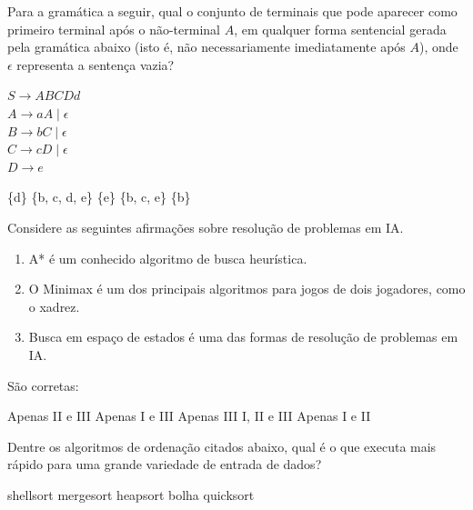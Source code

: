 \documentclass[12pt, addpoints]{exam}
\begin{document}
\begin{questions}
Para a gramática a seguir, qual o conjunto de terminais que pode aparecer como primeiro terminal após o não-terminal \( A \), em qualquer forma sentencial gerada pela gramática abaixo (isto é, não necessariamente imediatamente após \( A \)), onde \( \epsilon \) representa a sentença vazia?



$S \rightarrow ABCDd$\\

$A \rightarrow aA \mid \epsilon$\\

$B \rightarrow bC \mid \epsilon$\\

$C \rightarrow cD \mid \epsilon$\\

$D \rightarrow e$\\
\begin{choices}
\choice \{d\}
\choice \{b, c, d, e\}
\choice \{e\}
\choice \{b, c, e\}
\choice \{b\}
\end{choices}

\question

Considere as seguintes afirmações sobre resolução de problemas em IA.

\begin{enumerate}[label=\Roman*.]

    \item A* é um conhecido algoritmo de busca heurística.

    \item O Minimax é um dos principais algoritmos para jogos de dois jogadores, como o xadrez.

    \item Busca em espaço de estados é uma das formas de resolução de problemas em IA.

\end{enumerate}

São corretas:
\begin{choices}
\choice Apenas II e III
\choice Apenas I e III
\choice Apenas III
\choice I, II e III
\choice Apenas I e II
\end{choices}

\question

Dentre os algoritmos de ordenação citados abaixo, qual é o que executa mais rápido para uma grande variedade de entrada de dados? 
\begin{choices}
\choice shellsort
\choice mergesort
\choice heapsort
\choice bolha
\choice quicksort
\end{choices}



    \end{questions}
    
\end{document}

